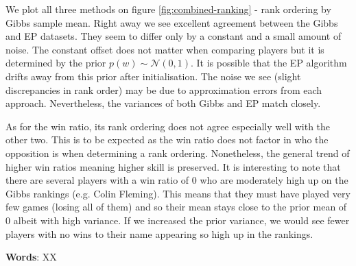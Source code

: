 \documentclass[]{article}
\newcommand{\Ncal}{\mathcal{N}}
\begin{document}
We plot all three methods on figure \ref{fig:combined-ranking} - rank ordering by Gibbs sample mean. Right away we see excellent agreement between the Gibbs and EP datasets. They seem to differ only by a constant and a small amount of noise. The constant offset does not matter when comparing players but it is determined by the prior $p(w) \sim \Ncal(0, 1)$. It is possible that the EP algorithm drifts away from this prior after initialisation. The noise we see (slight discrepancies in rank order) may be due to approximation errors from each approach. Nevertheless, the variances of both Gibbs and EP match closely.

As for the win ratio, its rank ordering does not agree especially well with the other two. This is to be expected as the win ratio does not factor in who the opposition is when determining a rank ordering. Nonetheless, the general trend of higher win ratios meaning higher skill is preserved. It is interesting to note that there are several players with a win ratio of 0 who are moderately high up on the Gibbs rankings (e.g. Colin Fleming). This means that they must have played very few games (losing all of them) and so their mean stays close to the prior mean of 0 albeit with high variance. If we increased the prior variance, we would see fewer players with no wins to their name appearing so high up in the rankings.

\textbf{Words}: XX
\end{document}
